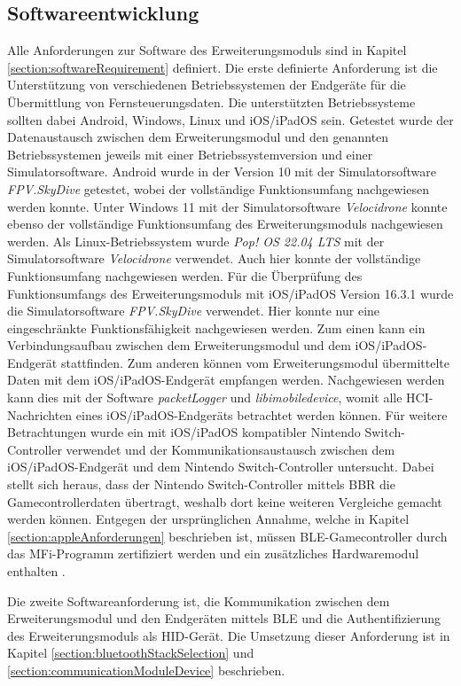 \subsection{Softwareentwicklung}
Alle Anforderungen zur Software des Erweiterungsmoduls sind in Kapitel \ref{section:softwareRequirement} definiert. Die erste definierte Anforderung ist die Unterstützung von verschiedenen Betriebssystemen der Endgeräte für die Übermittlung von Fernsteuerungsdaten. Die unterstützten Betriebssysteme sollten dabei Android, Windows, Linux und iOS/iPadOS sein. Getestet wurde der Datenaustausch zwischen dem Erweiterungsmodul und den genannten Betriebssystemen jeweils mit einer Betriebssystemversion und einer Simulatorsoftware. Android wurde in der Version 10 mit der Simulatorsoftware \textit{FPV.SkyDive} getestet, wobei der vollständige Funktionsumfang nachgewiesen werden konnte. Unter Windows 11 mit der Simulatorsoftware \textit{Velocidrone} konnte ebenso der vollständige Funktionsumfang des Erweiterungsmoduls nachgewiesen werden. Als Linux-Betriebssystem wurde \textit{Pop! OS 22.04 LTS} mit der Simulatorsoftware \textit{Velocidrone} verwendet. Auch hier konnte der vollständige Funktionsumfang nachgewiesen werden. Für die Überprüfung des Funktionsumfangs des Erweiterungsmoduls mit iOS/iPadOS Version 16.3.1 wurde die Simulatorsoftware \textit{FPV.SkyDive} verwendet. Hier konnte nur eine eingeschränkte Funktionsfähigkeit nachgewiesen werden. Zum einen kann ein Verbindungsaufbau zwischen dem Erweiterungsmodul und dem iOS/iPadOS-Endgerät stattfinden. Zum anderen können vom Erweiterungsmodul übermittelte Daten mit dem iOS/iPadOS-Endgerät empfangen werden. Nachgewiesen werden kann dies mit der Software \textit{packetLogger} und \textit{libimobiledevice}, womit alle \ac{HCI}-Nachrichten eines iOS/iPadOS-Endgeräts betrachtet werden können. Für weitere Betrachtungen wurde ein mit iOS/iPadOS kompatibler Nintendo Switch-Controller verwendet und der Kommunikationsaustausch zwischen dem iOS/iPadOS-Endgerät und dem Nintendo Switch-Controller untersucht. Dabei stellt sich heraus, dass der Nintendo Switch-Controller mittels \ac{BBR} die Gamecontrollerdaten übertragt, weshalb dort keine weiteren Vergleiche gemacht werden können. Entgegen der ursprünglichen Annahme, welche in Kapitel \ref{section:appleAnforderungen} beschrieben ist, müssen \ac{BLE}-Gamecontroller durch das \ac{MFi}-Programm zertifiziert werden und ein zusätzliches Hardwaremodul enthalten \cite{lemmingDevESP32Comment}.

Die zweite Softwareanforderung ist, die Kommunikation zwischen dem Erweiterungsmodul und den Endgeräten mittels \ac{BLE} und die Authentifizierung des Erweiterungsmoduls als \ac{HID}-Gerät. Die Umsetzung dieser Anforderung ist in Kapitel \ref{section:bluetoothStackSelection} und \ref{section:communicationModuleDevice} beschrieben.

